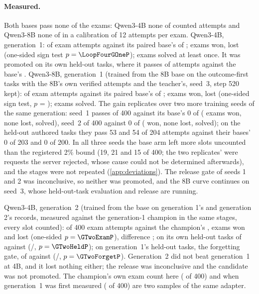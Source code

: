 \paragraph{Measured.} Both bases pass none of the exams: Qwen3-4B none of \BaseCalFourAttempts{} counted attempts and
Qwen3-8B none of \BaseCalEightAttempts{} in a calibration of 12 attempts per exam. Qwen3-4B, generation~1:
\LoopFourGOnePasses{} of \LoopFourGOneAttempts{} exam attempts against its paired base's \LoopFourGOneBasePasses{} of
\LoopFourGOneBaseAttempts{}; \LoopFourGOneWins{} exams won, \LoopFourGOneLosses{} lost (one-sided sign test
$p=\LoopFourGOneP$); \LoopFourGOneSolved{} exams solved at least once. It was promoted on its own held-out tasks, where it
passes \LoopFourGOneHeldout{} of attempts against the base's \LoopFourGOneHeldoutBase. Qwen3-8B, generation~1 (trained from the
8B base on the outcome-first tasks with the 8B's own verified attempts and the teacher's, seed~3, step 520 kept): \LoopEightGOnePasses{}
of \LoopEightGOneAttempts{} exam attempts against its paired base's \LoopEightGOneBasePasses{} of \LoopEightGOneBaseAttempts{};
\LoopEightGOneWins{} exams won, \LoopEightGOneLosses{} lost (one-sided sign test, $p$ = \LoopEightGOneP); \LoopEightGOneSolved{} exams solved. The gain
replicates over two more training seeds of the same generation: seed~1 passes \LoopEightRepOnePasses{} of 400 against its base's
0 of \LoopEightRepOneBaseAttempts{} (\LoopEightRepOneWins{} exams won, none lost, \LoopEightRepOneSolved{} solved), seed~2
\LoopEightRepTwoPasses{} of 400 against 0 of \LoopEightRepTwoBaseAttempts{} (\LoopEightRepTwoWins{} won, none lost,
\LoopEightRepTwoSolved{} solved); on the held-out authored tasks they pass 53 and 54 of 204 attempts against their bases' 0 of
203 and 0 of 200. In all three seeds the base arm left more slots uncounted than the registered 2\% bound (19, 21 and 15 of
400; the two replicates' were requests the server rejected, whose cause could not be determined afterwards), and the stages
were not repeated (\cref{app:deviations}). The release gate of seeds 1 and 2 was inconclusive, so neither was promoted, and the
8B curve continues on seed~3, whose held-out-task evaluation and release are running.

Qwen3-4B, generation~2 (trained from the base on generation 1's and generation 2's records, measured against the generation-1
champion in the same stages, every slot counted): \GTwoExam{} of 400 exam attempts against the champion's \GTwoChampExam{},
\GTwoExamWins{} exams won and \GTwoExamLosses{} lost (one-sided $p=\GTwoExamP$), difference \GTwoExamDiff; on its own held-out
tasks \GTwoHeld{} of \GTwoHeldAttempts{} against \GTwoChampHeld{} (\GTwoHeldWins{}/\GTwoHeldLosses{}, $p=\GTwoHeldP$); on
generation~1's held-out tasks, the forgetting gate, \GTwoForget{} of \GTwoForgetAttempts{} against \GTwoChampForget{}
(\GTwoForgetWins{}/\GTwoForgetLosses{}, $p=\GTwoForgetP$). Generation~2 did not beat generation~1 at 4B, and it lost nothing
either; the release was inconclusive and the candidate was not promoted. The champion's own exam count here (\GTwoChampExam{}
of 400) and when generation~1 was first measured (\LoopFourGOnePasses{} of 400) are two samples of the same adapter.

